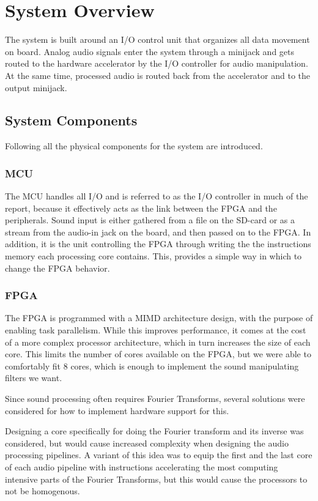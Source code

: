 \section{System Overview}

The system is built around an I/O control unit that organizes all data movement
on board. Analog audio signals enter the system through a minijack and gets
routed to the hardware accelerator by the I/O controller for audio manipulation.
At the same time, processed audio is routed back from the accelerator and to the
output minijack.

\subsection{System Components}
Following all the physical components for the system are introduced.

\subsubsection{MCU}\label{intro:system-components-mcu}

The MCU handles all I/O and is referred to as the I/O controller in much of the
report, because it effectively acts as the link between the FPGA and the
peripherals. Sound input is either gathered from a file on the SD-card or as a
stream from the audio-in jack on the board, and then passed on to the FPGA. In
addition, it is the unit controlling the FPGA through writing the the
instructions memory each processing core contains. This, provides a simple way
in which to change the FPGA behavior.

\subsubsection{FPGA}

The FPGA is programmed with a MIMD architecture design, with the purpose of
enabling task parallelism. While this improves performance, it comes at the cost
of a more complex processor architecture, which in turn increases the size of
each core. This limits the number of cores available on the FPGA, but we were
able to comfortably fit 8 cores, which is enough to implement the sound
manipulating filters we want.

Since sound processing often requires Fourier Transforms, several solutions were
considered for how to implement hardware support for this.

Designing a core specifically for doing the Fourier transform and its inverse
was considered, but would cause increased complexity when designing the audio
processing pipelines. A variant of this idea was to equip the first and the last
core of each audio pipeline with instructions accelerating the most computing
intensive parts of the Fourier Transforms, but this would cause the processors
to not be homogenous.

